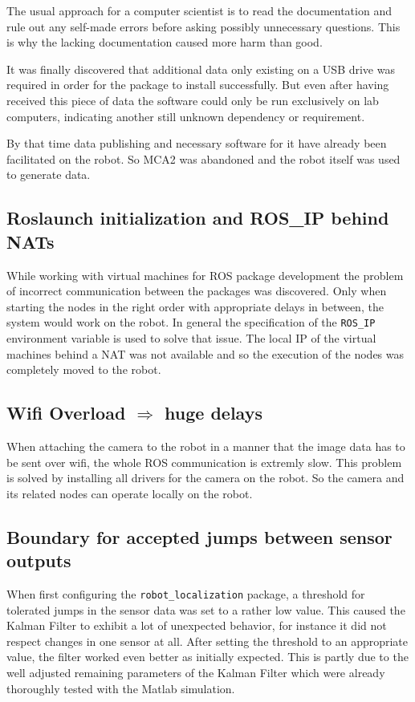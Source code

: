 The usual approach for a computer scientist is to read the documentation and rule out any self-made errors before asking possibly unnecessary questions. This is why the lacking documentation caused more harm than good.

It was finally discovered that additional data only existing on a USB drive was required in order for the package to install successfully. But even after having received this piece of data the software could only be run exclusively on lab computers, indicating another still unknown dependency or requirement.

By that time data publishing and necessary software for it have already been facilitated on the robot. So MCA2 was abandoned and the robot itself was used to generate data.

\subsection{Roslaunch initialization and ROS\_IP behind NATs}
While working with virtual machines for ROS package development the problem of incorrect communication between the packages was discovered. Only when starting the nodes in the right order with appropriate delays in between, the system would work on the robot. In general the specification of the \texttt{ROS\_IP} environment variable is used to solve that issue. The local IP of the virtual machines behind a NAT was not available and so the execution of the nodes was completely moved to the robot.

\subsection{Wifi Overload $\Rightarrow$ huge delays}
When attaching the camera to the robot in a manner that the image data has to be sent over wifi, the whole ROS communication is extremly slow. This problem is solved by installing all drivers for the camera on the robot. So the camera and its related nodes can operate locally on the robot.

\subsection{Boundary for accepted jumps between sensor outputs}
When first configuring the \texttt{robot\_localization} package, a threshold for tolerated jumps in the sensor data was set to a rather low value. This caused the Kalman Filter to exhibit a lot of unexpected behavior, for instance it did not respect changes in one sensor at all. After setting the threshold to an appropriate value, the filter worked even better as initially expected. This is partly due to the well adjusted remaining parameters of the Kalman Filter which were already thoroughly tested with the Matlab simulation.

